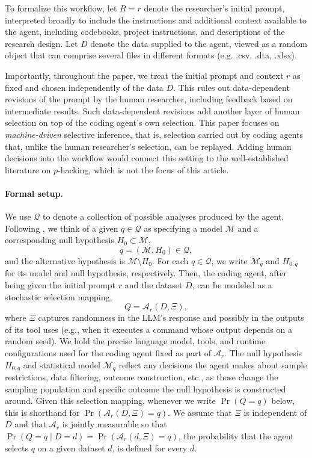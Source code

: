 \documentclass[10pt]{article}
\begin{document}
To formalize this workflow, let $R=r$ denote the researcher's initial prompt, interpreted broadly to include the instructions and additional context available to the agent, including codebooks, project instructions, and descriptions of the research design. Let $D$ denote the data supplied to the agent, viewed as a random object that can comprise several files in different formats (e.g. .csv, .dta, .xlsx).

Importantly, throughout the paper, we treat the initial prompt and context $r$ as fixed and chosen independently of the data $D$. This rules out data-dependent revisions of the prompt by the human researcher, including feedback based on intermediate results. Such data-dependent revisions add another layer of human selection on top of the coding agent's own selection. This paper focuses on \textit{machine-driven} selective inference, that is, selection carried out by coding agents that, unlike the human researcher’s selection, can be replayed. Adding human decisions into the workflow would connect this setting to the well-established literature on $p$-hacking, which is not the focus of this article.

\paragraph{Formal setup.} We use $\mathcal Q$ to denote a collection of possible analyses produced by the agent. Following \citet{fithian2014optimal}, we think of a given $q\in\mathcal Q$ as specifying a model $\mathcal{M}$ and a corresponding null hypothesis $H_{0} \subset \mathcal M$,
\[
q = (\mathcal{M}, H_0) \in \mathcal{Q},
\]
and the alternative hypothesis is $\mathcal M \setminus H_0$. For each $q\in\mathcal Q$, we write $\mathcal M_q$ and $H_{0,q}$ for its model and null hypothesis, respectively. Then, the coding agent, after being given the initial prompt $r$ and the dataset $D$, can be modeled as a stochastic selection mapping,
\begin{equation} \label{eq:selection_mapping}
Q = \mathcal{A}_r(D, \Xi),
\end{equation}
where $\Xi$ captures randomness in the LLM's response and possibly in the outputs of its tool uses (e.g., when it executes a command whose output depends on a random seed). We hold the precise language model, tools, and runtime configurations used for the coding agent fixed as part of $\mathcal{A}_r$. The null hypothesis $H_{0,q}$ and statistical model $\mathcal M_q$ reflect any decisions the agent makes about sample restrictions, data filtering, outcome construction, etc., as those change the sampling population and specific outcome the null hypothesis is constructed around. Given this selection mapping, whenever we write $\Pr(Q=q)$ below, this is shorthand for $\Pr(\mathcal{A}_r(D, \Xi) = q)$. We assume that $\Xi$ is independent of $D$ and that $\mathcal A_r$ is jointly measurable so that $\Pr(Q=q\mid D=d)=\Pr(\mathcal A_r(d,\Xi)=q)$, the probability that the agent selects $q$ on a given dataset $d$, is defined for every $d$.
\end{document}
